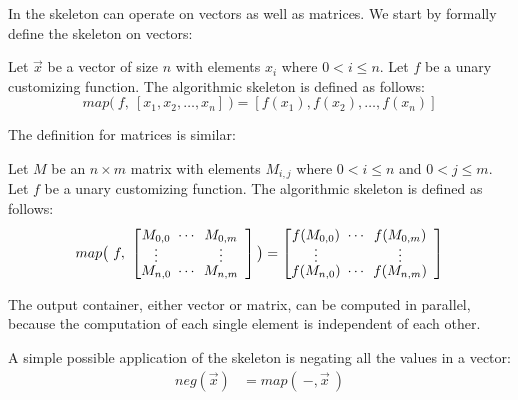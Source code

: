 In \SkelCL the \map skeleton can operate on vectors as well as matrices.
We start by formally define the skeleton on vectors:
\begin{definition}
  \label{definition:map}
  Let $\vec{x}$ be a vector of size $n$ with elements $x_i$ where $0 < i \leq n$.
  Let $f$ be a unary customizing function.
  The algorithmic skeleton \map is defined as follows:
  \begin{equation}
    map \big(\ f,\ [x_1, x_2, \dots, x_n]\ \big) = [f(x_1), f(x_2), \dots, f(x_n)]
  \end{equation}
\end{definition}
\noindent
The definition for matrices is similar:
\begin{definition}
  \label{definition:map:matrix}
  Let $M$ be an $n\times m$ matrix with elements $M_{i,j}$ where $0 < i \leq n$ and $0 < j \leq m$.
  Let $f$ be a unary customizing function.
  The algorithmic skeleton \map is defined as follows:
  \begin{equation}
    map\big(\ f,\ \DottedMatrix{M_{0,0}}{M_{0,m}}{M_{n,0}}{M_{n,m}} \big)
      = \DottedMatrix{f(M_{0,0})}{f(M_{0,m})}{f(M_{n,0})}{f(M_{n,m})}
  \end{equation}
\end{definition}
\noindent
The output container, either vector or matrix, can be computed in parallel, because the computation of each single element is independent of each other.

A simple possible application of the \map skeleton is negating all the values in a vector:
\begin{align*}
  neg(\vec{x}) &= map(\ -, \vec{x}\ )
\end{align*}


